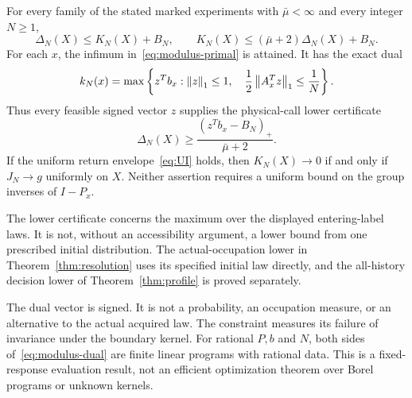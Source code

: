 \begin{theorem}\label{thm:modulus}
For every family of the stated marked experiments with $\bar\mu<\infty$ and every integer $N\ge1$,
\begin{equation}\label{eq:modulus-comparison}
 \Delta_N(X)\le K_N(X)+B_N,
 \qquad K_N(X)\le(\bar\mu+2)\Delta_N(X)+B_N.
\end{equation}
For each $x$, the infimum in~\eqref{eq:modulus-primal} is attained. It has the exact dual
\begin{equation}\label{eq:modulus-dual}
 k_N(x)=\max\left\{z^Tb_x:
       \left\lVert z\right\rVert_1\le1,\quad \frac12\left\lVert A_x^Tz\right\rVert_1\le\frac1N\right\}.
\end{equation}
Thus every feasible signed vector $z$ supplies the physical-call lower certificate
\begin{equation}\label{eq:dual-lower}
 \Delta_N(X)\ge
 \frac{(z^Tb_x-B_N)_+}{\bar\mu+2}.
\end{equation}
If the uniform return envelope~\eqref{eq:UI} holds, then $K_N(X)\to0$ if and only if $J_N\to g$ uniformly on $X$. Neither assertion requires a uniform bound on the group inverses of $I-P_x$.
\end{theorem}
The lower certificate concerns the maximum over the displayed entering-label laws. It is not, without an accessibility argument, a lower bound from one prescribed initial distribution. The actual-occupation lower in Theorem~\ref{thm:resolution} uses its specified initial law directly, and the all-history decision lower of Theorem~\ref{thm:profile} is proved separately.

The dual vector is signed. It is not a probability, an occupation measure, or an alternative to the actual acquired law. The constraint measures its failure of invariance under the boundary kernel. For rational $P,b$ and $N$, both sides of~\eqref{eq:modulus-dual} are finite linear programs with rational data. This is a fixed-response evaluation result, not an efficient optimization theorem over Borel programs or unknown kernels.

